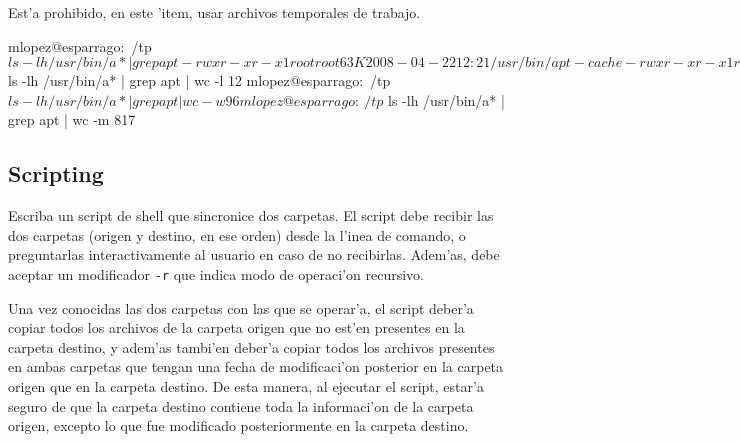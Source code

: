 \begin{enumerate}
\begin{enumerate}
Est'a prohibido, en este 'item, usar archivos temporales de trabajo.

\begin{lastTwo}
mlopez@esparrago:~/tp$ ls -lh /usr/bin/a* | grep apt
-rwxr-xr-x 1 root root  63K 2008-04-22 12:21 /usr/bin/apt-cache
-rwxr-xr-x 1 root root  18K 2008-04-22 12:21 /usr/bin/apt-cdrom
-rwxr-xr-x 1 root root 9.9K 2008-04-22 12:21 /usr/bin/apt-config
-rwxr-xr-x 1 root root  22K 2008-04-22 12:21 /usr/bin/apt-extracttemplates
-rwxr-xr-x 1 root root 187K 2008-04-22 12:21 /usr/bin/apt-ftparchive
-rwxr-xr-x 1 root root 139K 2008-04-22 12:21 /usr/bin/apt-get
-rwxr-xr-x 1 root root 2.2M 2008-04-04 06:56 /usr/bin/aptitude
-rwxr-xr-x 1 root root 1.9K 2008-04-04 06:56 /usr/bin/aptitude-create-state-bundle
-rwxr-xr-x 1 root root 3.0K 2008-04-04 06:56 /usr/bin/aptitude-run-state-bundle
-rwxr-xr-x 1 root root 5.0K 2008-04-22 12:20 /usr/bin/apt-key
-rwxr-xr-x 1 root root 2.2K 2008-04-22 12:20 /usr/bin/apt-mark
-rwxr-xr-x 1 root root  26K 2008-04-22 12:21 /usr/bin/apt-sortpkgs
mlopez@esparrago:~/tp$ ls -lh /usr/bin/a* | grep apt | wc -l
12
mlopez@esparrago:~/tp$ ls -lh /usr/bin/a* | grep apt | wc -w
96
mlopez@esparrago:~/tp$ ls -lh /usr/bin/a* | grep apt | wc -m
817
\end{lastTwo}

\end{enumerate}

\end{enumerate}

\subsection{Scripting}

Escriba un script de shell que sincronice dos carpetas. El script debe recibir las dos carpetas (origen y destino, en ese
orden) desde la l'inea de comando, o preguntarlas interactivamente al usuario en caso de no recibirlas. Adem'as, debe
aceptar un modificador \texttt{-r} que indica modo de operaci'on recursivo.

Una vez conocidas las dos carpetas con las que se operar'a, el script deber'a copiar todos los archivos de la carpeta origen
que no est'en presentes en la carpeta destino, y adem'as tambi'en deber'a copiar todos los archivos presentes en ambas
carpetas que tengan una fecha de modificaci'on posterior en la carpeta origen que en la carpeta destino. De esta manera, al
ejecutar el script, estar'a seguro de que la carpeta destino contiene toda la informaci'on de la carpeta origen, excepto lo
que fue modificado posteriormente en la carpeta destino.

